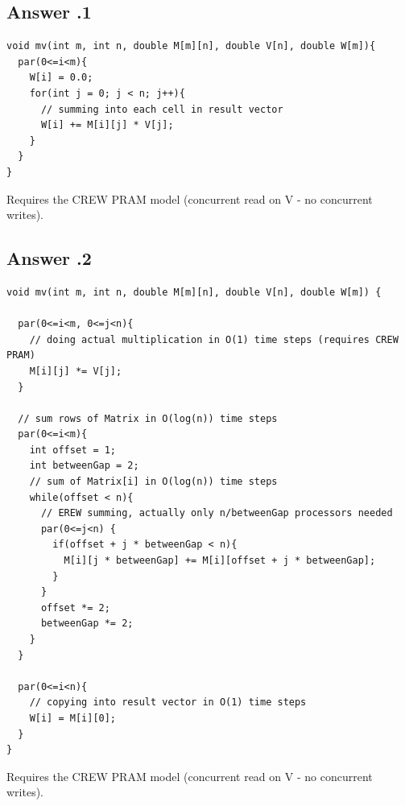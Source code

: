 \documentclass[a4paper,%
11pt,%
DIV=12,
headsepline,%
headings=normal,
]{scrartcl}
\newcounter{curex}
\newcommand{\answer}[1]{\subsection*{Answer \arabic{curex}.#1}}
\begin{document}
\answer{1}
\begin{minipage}[t]{1.0\linewidth}
\begin{lstlisting}
void mv(int m, int n, double M[m][n], double V[n], double W[m]){
  par(0<=i<m){
    W[i] = 0.0;
    for(int j = 0; j < n; j++){
      // summing into each cell in result vector 
      W[i] += M[i][j] * V[j];
    }
  }
}
\end{lstlisting}
\end{minipage}
Requires the CREW PRAM model (concurrent read on V - no concurrent writes).

\answer{2}
\begin{minipage}[t]{1.0\linewidth}
\begin{lstlisting}
void mv(int m, int n, double M[m][n], double V[n], double W[m]) {
  
  par(0<=i<m, 0<=j<n){
    // doing actual multiplication in O(1) time steps (requires CREW PRAM)
    M[i][j] *= V[j];
  }

  // sum rows of Matrix in O(log(n)) time steps
  par(0<=i<m){
    int offset = 1;
    int betweenGap = 2;
    // sum of Matrix[i] in O(log(n)) time steps
    while(offset < n){
      // EREW summing, actually only n/betweenGap processors needed
      par(0<=j<n) {
        if(offset + j * betweenGap < n){
          M[i][j * betweenGap] += M[i][offset + j * betweenGap];
        }
      }
      offset *= 2;
      betweenGap *= 2;
    }
  }
  
  par(0<=i<n){
    // copying into result vector in O(1) time steps
    W[i] = M[i][0];
  }
}
\end{lstlisting}
\end{minipage}
Requires the CREW PRAM model (concurrent read on V - no concurrent writes).
\end{document}
